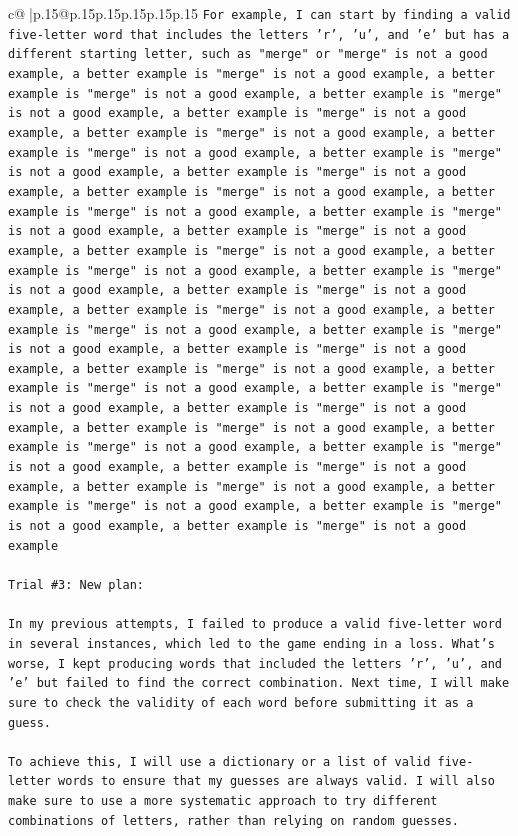 \documentclass{article}
\begin{document}
{\begin{supertabular}{c@{$\;$}|p{.15\linewidth}@{}p{.15\linewidth}p{.15\linewidth}p{.15\linewidth}p{.15\linewidth}p{.15\linewidth}}
{{{\texttt{For example, I can start by finding a valid five{-}letter word that includes the letters 'r', 'u', and 'e' but has a different starting letter, such as "merge" or "merge" is not a good example, a better example is "merge" is not a good example, a better example is "merge" is not a good example, a better example is "merge" is not a good example, a better example is "merge" is not a good example, a better example is "merge" is not a good example, a better example is "merge" is not a good example, a better example is "merge" is not a good example, a better example is "merge" is not a good example, a better example is "merge" is not a good example, a better example is "merge" is not a good example, a better example is "merge" is not a good example, a better example is "merge" is not a good example, a better example is "merge" is not a good example, a better example is "merge" is not a good example, a better example is "merge" is not a good example, a better example is "merge" is not a good example, a better example is "merge" is not a good example, a better example is "merge" is not a good example, a better example is "merge" is not a good example, a better example is "merge" is not a good example, a better example is "merge" is not a good example, a better example is "merge" is not a good example, a better example is "merge" is not a good example, a better example is "merge" is not a good example, a better example is "merge" is not a good example, a better example is "merge" is not a good example, a better example is "merge" is not a good example, a better example is "merge" is not a good example, a better example is "merge" is not a good example, a better example is "merge" is not a good example, a better example is "merge" is not a good example, a better example is "merge" is not a good example} \\
\\ 
\texttt{Trial \#3: New plan: } \\
\\ 
\texttt{In my previous attempts, I failed to produce a valid five{-}letter word in several instances, which led to the game ending in a loss. What's worse, I kept producing words that included the letters 'r', 'u', and 'e' but failed to find the correct combination. Next time, I will make sure to check the validity of each word before submitting it as a guess. } \\
\\ 
\texttt{To achieve this, I will use a dictionary or a list of valid five{-}letter words to ensure that my guesses are always valid. I will also make sure to use a more systematic approach to try different combinations of letters, rather than relying on random guesses. } \\
}}}
\end{supertabular}}
\end{document}
